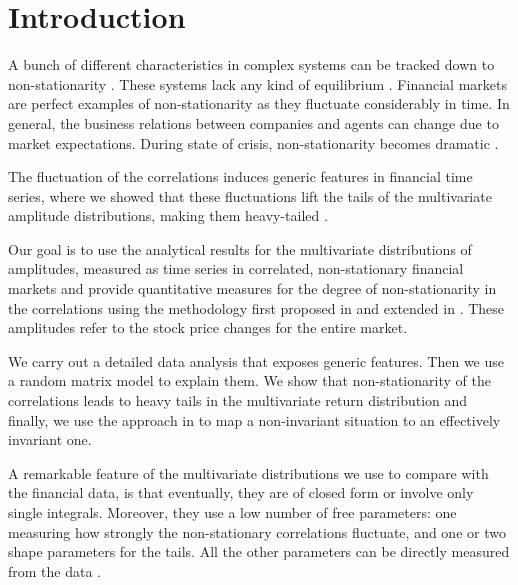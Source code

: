 \section{Introduction}\label{sec:introduction}

A bunch of different characteristics in complex systems can be tracked down to
non-stationarity \cite{non_stat_1,non_stat_2}. These systems lack any kind of
equilibrium \cite{comp_sys_1,comp_sys_2,comp_sys_3,comp_sys_4}. Financial
markets are perfect examples of non-stationarity as they fluctuate considerably
in time. In general, the business relations between companies and agents can
change due to market expectations. During state of crisis, non-stationarity
becomes dramatic
\cite{state_crisis_1,state_crisis_2,state_crisis_3,state_crisis_4,state_crisis_5,state_crisis_6,state_crisis_7}.

The fluctuation of the correlations induces generic features in financial time
series, where we showed that these fluctuations lift the tails of the
multivariate amplitude distributions, making them heavy-tailed
\cite{non_stationarity_fin_guhr,exact_distributions_guhr}.

Our goal is to use the analytical results for the multivariate distributions of
amplitudes, measured as time series in correlated, non-stationary financial
markets and provide quantitative measures for the degree of non-stationarity in
the correlations using the methodology first proposed in
\cite{non_stationarity_fin_guhr} and extended in
\cite{exact_distributions_guhr}. These amplitudes refer to the stock price
changes for the entire market.

We carry out a detailed data analysis that exposes generic features. Then we
use a random matrix model to explain them. We show that non-stationarity of the
correlations leads to heavy tails in the multivariate return distribution and
finally, we use the approach in
\cite{non_stationarity_fin_guhr,exact_distributions_guhr} to map a
non-invariant situation to an effectively invariant one.

A remarkable feature of the multivariate distributions we use to compare with
the financial data, is that eventually, they are of closed form or involve only
single integrals. Moreover, they use a low number of free parameters: one
measuring how strongly the non-stationary correlations fluctuate, and one or
two shape parameters for the tails. All the other parameters can be directly
measured from the data \cite{exact_distributions_guhr}.

